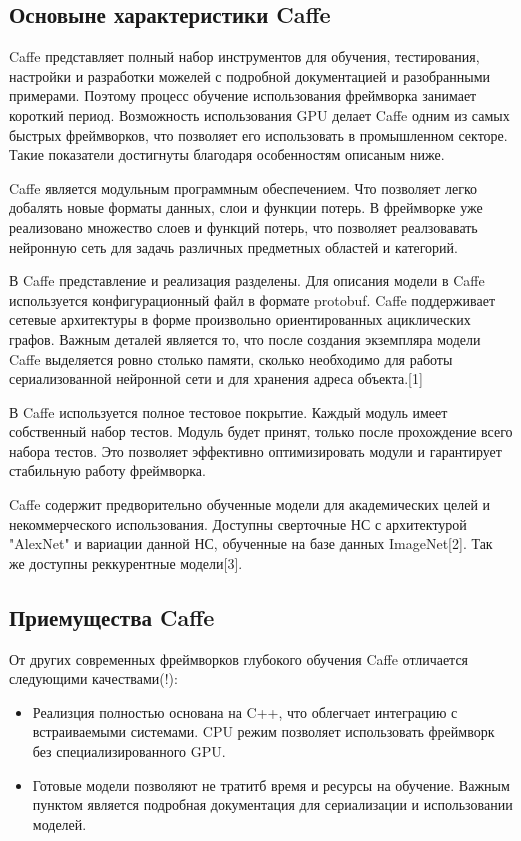 \documentclass[a4paper,english,russian]{G2-105}
\begin{document}
\subsection{Основыне характеристики Caffe}
\par Caffe представляет полный набор инструментов для обучения, тестирования, настройки и разработки можелей с подробной документацией и разобранными примерами. Поэтому процесс обучение использования фреймворка занимает короткий период. Возможность использования GPU делает Caffe одним из самых быстрых фреймворков, что позволяет его использовать в промышленном секторе. Такие показатели достигнуты благодаря особенностям описаным ниже.
\par Caffe является модульным программным обеспечением. Что позволяет легко добалять новые форматы данных, слои и функции потерь. В фреймворке уже реализовано множество слоев и функций потерь, что позволяет реалзовавать нейронную сеть для задачь различных предметных областей и категорий.
\par В Caffe представление и реализация разделены. Для описания модели в Caffe используется конфигурационный файл в формате protobuf. Caffe поддерживает сетевые архитектуры в форме произвольно ориентированных ациклических графов. Важным деталей является то, что после создания экземпляра модели Caffe выделяется ровно столько памяти, сколько необходимо для работы сериализованной нейронной сети и для хранения адреса объекта.[1]
\par В Caffe используется полное тестовое покрытие. Каждый модуль имеет собственный набор тестов. Модуль будет принят, только после прохождение всего набора тестов. Это позволяет эффективно оптимизировать модули и гарантирует стабильную работу фреймворка.
\par Caffe содержит предворительно обученные модели для академических целей и некоммерческого использования. Доступны сверточные НС с архитектурой "AlexNet" и вариации данной НС, обученные на базе данных ImageNet[2]. Так же доступны реккурентные модели[3].
\subsection{Приемущества Caffe}
\par От других современных фреймворков глубокого обучения Caffe отличается следующими качествами(!):
\begin{itemize}
	\item Реализция полностью основана на C++, что облегчает интеграцию с встраиваемыми системами. CPU режим позволяет использовать фреймворк без специализированного GPU.
	\item Готовые модели позволяют не тратитб время и ресурсы на обучение. Важным пунктом является подробная документация для сериализации и использовании моделей.
\end{itemize}
\end{document}
